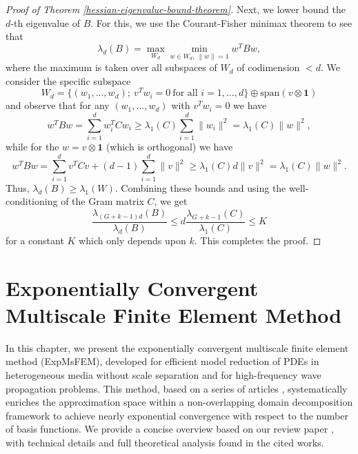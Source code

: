 \documentclass[12pt]{caltech_thesis}
\numberwithin{equation}{section}
\begin{document}
\begin{proof}[Proof of Theorem \ref{hessian-eigenvalue-bound-theorem}]
    Next, we lower bound the $d$-th eigenvalue of $B$. For this, we use the Courant-Fisher minimax theorem to see that
    \begin{equation}
        \lambda_{d}(B) = \max_{W_{d}}\min_{w\in W_{d},~\|w\| = 1} w^TBw,
    \end{equation}
    where the maximum is taken over all subspaces of $W_d$ of codimension $<d$. We consider the specific subspace
    \begin{equation}
        W_d = \{(w_1,...,w_d);~v^Tw_i = 0~\text{for all $i=1,...,d$}\} \oplus \text{span}(v\otimes \mathbf{1})
    \end{equation}
    and observe that for any $(w_1,...,w_d)$ with $v^Tw_i = 0$ we have
    \begin{equation}
        w^TBw = \sum_{i=1}^d w_i^TCw_i \geq \lambda_1(C)\sum_{i=1}^d \|w_i\|^2 = \lambda_1(C)\|w\|^2,
    \end{equation}
    while for the $w = v\otimes \mathbf{1}$ (which is orthogonal) we have
    \begin{equation}
        w^TBw = \sum_{i=1}^d v^TCv + (d-1)\sum_{i=1}^d \|v\|^2 \geq \lambda_1(C)d\|v\|^2 = \lambda_1(C)\|w\|^2.
    \end{equation}
    Thus, $\lambda_d(B) \geq \lambda_1(W)$. Combining these bounds and using the well-conditioning of the Gram matrix $C$, we get
    \begin{equation}
    \frac{\lambda_{(G+k-1)d}(B)}{\lambda_{d}(B)} \leq d\frac{\lambda_{G+k-1}(C)}{\lambda_1(C)} \leq K
    \end{equation}
    for a constant $K$ which only depends upon $k$. This completes the proof.
\end{proof}










\chapter{Exponentially Convergent Multiscale Finite Element Method}
\label{chap:4}
In this chapter, we present the exponentially convergent multiscale finite element method (ExpMsFEM), developed for efficient model reduction of PDEs in heterogeneous media without scale separation and for high-frequency wave propagation problems. This method, based on a series of articles \cite{chen2021exponential, chen2023exponentially, chen2024exponentially}, systematically enriches the approximation space within a non-overlapping domain decomposition framework to achieve nearly exponential convergence with respect to the number of basis functions. We provide a concise overview based on our review paper \cite{chen2024exponentially}, with technical details and full theoretical analysis found in the cited works.
\end{document}
